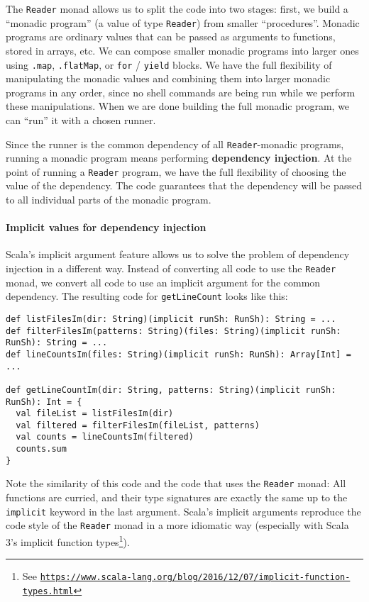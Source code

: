 The \lstinline!Reader! monad allows us to split the code into two
stages: first, we build a \textsf{``}monadic program\textsf{''} (a value of type \lstinline!Reader!)
from smaller \textsf{``}procedures\textsf{''}. Monadic programs are ordinary values
that can be passed as arguments to functions, stored in arrays, etc.
We can compose smaller monadic programs into larger ones using \lstinline!.map!,
\lstinline!.flatMap!, or \lstinline!for! / \lstinline!yield! blocks.
We have the full flexibility of manipulating the monadic values and
combining them into larger monadic programs in any order, since no
shell commands are being run while we perform these manipulations.
When we are done building the full monadic program, we can \textsf{``}run\textsf{''}
it with a chosen runner.

Since the runner is the common dependency of all \lstinline!Reader!-monadic
programs, running a monadic program means performing \textbf{dependency
injection}. At the point of running a
\lstinline!Reader! program, we have the full flexibility of choosing
the value of the dependency. The code guarantees that the dependency
will be passed to all individual parts of the monadic program.

\paragraph{Implicit values for dependency injection}

Scala\textsf{'}s implicit argument feature allows us to solve the problem of
dependency injection in a different way. Instead of converting all
code to use the \lstinline!Reader! monad, we convert all code to
use an implicit argument for the common dependency. The resulting
code for \lstinline!getLineCount! looks like this:
\begin{lstlisting}
def listFilesIm(dir: String)(implicit runSh: RunSh): String = ...
def filterFilesIm(patterns: String)(files: String)(implicit runSh: RunSh): String = ...
def lineCountsIm(files: String)(implicit runSh: RunSh): Array[Int] = ...

def getLineCountIm(dir: String, patterns: String)(implicit runSh: RunSh): Int = {
  val fileList = listFilesIm(dir)
  val filtered = filterFilesIm(fileList, patterns)
  val counts = lineCountsIm(filtered)
  counts.sum
}
\end{lstlisting}
Note the similarity of this code and the code that uses the \lstinline!Reader!
monad: All functions are curried, and their type signatures are exactly
the same up to the \lstinline!implicit! keyword in the last argument.
Scala\textsf{'}s implicit arguments reproduce the code style of the \lstinline!Reader!
monad in a more idiomatic way (especially with Scala 3\textsf{'}s implicit
function types\footnote{See \texttt{\href{https://www.scala-lang.org/blog/2016/12/07/implicit-function-types.html}{https://www.scala-lang.org/blog/2016/12/07/implicit-function-types.html}}}). 

